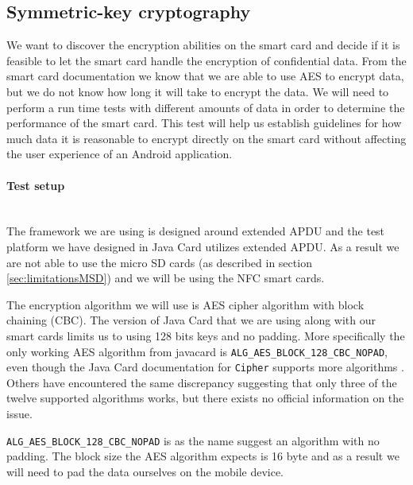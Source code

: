 \subsection{Symmetric-key cryptography}
\label{sec:symmetricTest}
We want to discover the encryption abilities on the smart card and decide if it is feasible to let the smart card handle the encryption of confidential data. From the smart card documentation we know that we are able to use AES to encrypt data, but we do not know how long it will take to encrypt the data. We will need to perform a run time tests with different amounts of data in order to determine the performance of the smart card. This test will help us establish guidelines for how much data it is reasonable to encrypt directly on the smart card without affecting the user experience of an Android application.

\paragraph{Test setup}\mbox{}\\
The framework we are using is designed around extended APDU and the test platform we have designed in Java Card utilizes extended APDU. As a result we are not able to use the micro SD cards (as described in section \ref{sec:limitationsMSD}) and we will be using the NFC smart cards.

The encryption algorithm we will use is AES cipher algorithm with block chaining (CBC). The version of Java Card that we are using along with our smart cards limits us to using 128 bits keys and no padding. More specifically the only working AES algorithm from javacard is \texttt{ALG\_AES\_BLOCK\_128\_CBC\_NOPAD}, even though the Java Card documentation for \texttt{Cipher} supports more algorithms \cite{javacardCipher}. Others have encountered the same discrepancy \cite{javacardCipherFail} suggesting that only three of the twelve supported algorithms works, but there exists no official information on the issue.

\texttt{ALG\_AES\_BLOCK\_128\_CBC\_NOPAD} is as the name suggest an algorithm with no padding. The block size the AES algorithm expects is 16 byte and as a result we will need to pad the data ourselves on the mobile device.

